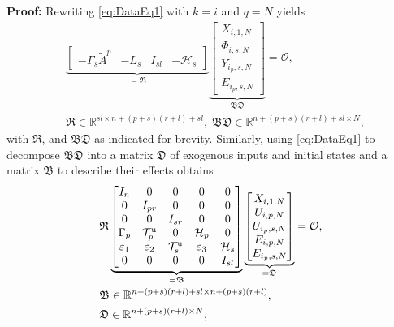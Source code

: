 \textbf{Proof:} 
Rewriting \eqref{eq:DataEq1} with $k=i$ and $q=N$ yields
\begin{align*}
    &\underbrace{\begin{bmatrix}-\Gamma_s \tilde{A}^p & -L_s & I_{sl}&-\mathcal{H}_s\end{bmatrix}}_{= \mathfrak{R}}
    \underbrace{\begin{bmatrix}
        X_{i,1,N}\\
        \Phi_{i,s,N}\\
        Y_{i_p,s,N}\\
        E_{i_p,s,N}
    \end{bmatrix}}_{\mathfrak{B}\mathfrak{D}}=\mathcal{O},\\
    &\mathfrak{R}\in\mathbb{R}^{sl\times n+(p+s)(r+l)+sl},\;\mathfrak{BD}\in\mathbb{R}^{n+(p+s)(r+l)+sl \times N},
\end{align*}
with $\mathfrak{R}$, and $\mathfrak{BD}$ as indicated for brevity. Similarly, using \eqref{eq:DataEq1} to decompose $\mathfrak{BD}$ into a matrix $\mathfrak{D}$ of exogenous inputs and initial states and a matrix $\mathfrak{B}$ to describe their effects obtains
\begin{align}
    &\mathfrak{R}
    \underbrace{\begin{bmatrix}
        I_n      & 0      & 0       & 0 & 0\\
        0        & I_{pr} & 0       & 0 & 0\\
        0        & 0      & I_{sr}  & 0 & 0\\
        \Gamma_p & \mathcal{T}_p^\mathrm{u} & 0 & \mathcal{H}_p & 0\\
        \varepsilon_1 & \varepsilon_2 & \mathcal{T}_s^\mathrm{u} & \varepsilon_3 & \mathcal{H}_s\\
        0 & 0 & 0 & 0 & I_{sl}
    \end{bmatrix}}_{=\mathfrak{B}}
    \underbrace{\begin{bmatrix}
        X_{i,1,N}\\
        U_{i,p,N}\\
        U_{i_p,s,N}\\
        E_{i,p,N}\\
        E_{i_p,s,N}
    \end{bmatrix}}_{=\mathfrak{D}}=\mathcal{O},\label{eq:RBD2}\\
    &\mathfrak{B}\in\mathbb{R}^{n+(p+s)(r+l)+sl\times n+(p+s)(r+l)},\notag\\
    &\mathfrak{D}\in\mathbb{R}^{n+(p+s)(r+l)\times N},\notag
\end{align}
